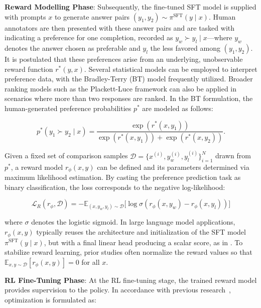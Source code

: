 \textbf{Reward Modelling Phase}: Subsequently, the fine-tuned SFT model is supplied with prompts $x$ to generate answer pairs $(y_1, y_2)\sim \pi^\text{SFT}(y \mid x)$. Human annotators are then presented with these answer pairs and are tasked with indicating a preference for one completion, recorded as $y_w\succ y_l \mid x$—where $y_w$ denotes the answer chosen as preferable and $y_l$ the less favored among $(y_1, y_2)$. It is postulated that these preferences arise from an underlying, unobservable reward function $r^*(y, x)$. Several statistical models can be employed to interpret preference data, with the Bradley-Terry (BT) model \cite{bradley1952rankanalysis} frequently utilized. Broader ranking models such as the Plackett-Luce framework \citep{plackett1975analysis, luce2012individual} can also be applied in scenarios where more than two responses are ranked. In the BT formulation, the human-generated preference probabilities $p^*$ are modeled as follows:

\begin{equation}\label{eq:bradley-terry}
    p^*(y_1\succ y_2 \mid x)=\frac{\exp\left(r^*(x, y_1)\right)}{\exp\left(r^*(x, y_1)\right) + \exp\left(r^*(x, y_2)\right)}.
\end{equation}

Given a fixed set of comparison samples $\mathcal{D}=\bigl\{x^{(i)}, y_w^{(i)}, y_l^{(i)}\bigr\}_{i=1}^N$ drawn from $p^*$, a reward model $r_{\phi}(x, y)$ can be defined and its parameters determined via maximum likelihood estimation. By casting the preference prediction task as binary classification, the loss corresponds to the negative log-likelihood:

\begin{equation}\label{eq:reward_model}
    \mathcal{L}_R(r_{\phi}, \mathcal{D}) = -\mathbb{E}_{(x, y_w, y_l)\sim \mathcal{D}}\bigl[\log \sigma(r_{\phi}(x, y_w)- r_{\phi}(x, y_l))\bigr]
\end{equation}

where $\sigma$ denotes the logistic sigmoid. In large language model applications, $r_{\phi}(x, y)$ typically reuses the architecture and initialization of the SFT model $\pi^\text{SFT}(y \mid x)$, but with a final linear head producing a scalar score, as in \cite{ziegler2020finetuning}. To stabilize reward learning, prior studies often normalize the reward values so that $\mathbb{E}_{x,y\sim \mathcal{D}}\left[r_\phi(x, y)\right] = 0$ for all $x$.

\textbf{RL Fine-Tuning Phase}: At the RL fine-tuning stage, the trained reward model provides supervision to the policy. In accordance with previous research~\citep{jaques2017sequence, jaques2020human}, optimization is formulated as:

